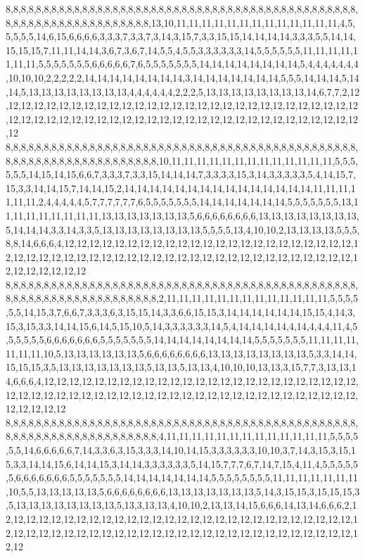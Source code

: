 8,8,8,8,8,8,8,8,8,8,8,8,8,8,8,8,8,8,8,8,8,8,8,8,8,8,8,8,8,8,8,8,8,8,8,8,8,8,8,8,8,8,8,8,8,8,8,8,8,8,8,8,8,8,8,8,8,8,8,8,8,8,8,8,8,13,10,11,11,11,11,11,11,11,11,11,11,11,11,11,4,5,5,5,5,5,14,6,15,6,6,6,6,3,3,3,7,3,3,7,3,14,3,15,7,3,3,15,15,14,14,14,14,3,3,3,5,5,14,14,15,15,15,7,11,11,14,14,3,6,7,3,6,7,14,5,5,4,5,5,3,3,3,3,3,3,14,5,5,5,5,5,5,11,11,11,11,11,11,11,5,5,5,5,5,5,5,6,6,6,6,6,7,6,5,5,5,5,5,5,5,14,14,14,14,14,14,14,14,5,4,4,4,4,4,4,4,10,10,10,2,2,2,2,2,14,14,14,14,14,14,14,14,3,14,14,14,14,14,14,14,5,5,5,14,14,14,5,14,14,5,13,13,13,13,13,13,13,13,4,4,4,4,4,4,2,2,2,5,13,13,13,13,13,13,13,13,14,6,7,7,2,12,12,12,12,12,12,12,12,12,12,12,12,12,12,12,12,12,12,12,12,12,12,12,12,12,12,12,12,12,12,12,12,12,12,12,12,12,12,12,12,12,12,12,12,12,12,12,12,12,12,12,12,12,12,12,12,12,12
8,8,8,8,8,8,8,8,8,8,8,8,8,8,8,8,8,8,8,8,8,8,8,8,8,8,8,8,8,8,8,8,8,8,8,8,8,8,8,8,8,8,8,8,8,8,8,8,8,8,8,8,8,8,8,8,8,8,8,8,8,8,8,8,8,8,10,11,11,11,11,11,11,11,11,11,11,11,11,11,5,5,5,5,5,5,14,15,14,15,6,6,7,3,3,3,7,3,3,15,14,14,14,7,3,3,3,3,15,3,14,3,3,3,3,3,5,4,14,15,7,15,3,3,14,14,15,7,14,14,15,2,14,14,14,14,14,14,14,14,14,14,14,14,14,14,14,11,11,11,11,11,11,2,4,4,4,4,4,5,7,7,7,7,7,7,6,5,5,5,5,5,5,5,14,14,14,14,14,14,14,5,5,5,5,5,5,5,13,11,11,11,11,11,11,11,11,13,13,13,13,13,13,13,5,6,6,6,6,6,6,6,6,13,13,13,13,13,13,13,13,5,14,14,14,3,3,14,3,3,5,13,13,13,13,13,13,13,13,5,5,5,5,13,4,10,10,2,13,13,13,13,5,5,5,8,8,14,6,6,6,4,12,12,12,12,12,12,12,12,12,12,12,12,12,12,12,12,12,12,12,12,12,12,12,12,12,12,12,12,12,12,12,12,12,12,12,12,12,12,12,12,12,12,12,12,12,12,12,12,12,12,12,12,12,12,12,12,12,12
8,8,8,8,8,8,8,8,8,8,8,8,8,8,8,8,8,8,8,8,8,8,8,8,8,8,8,8,8,8,8,8,8,8,8,8,8,8,8,8,8,8,8,8,8,8,8,8,8,8,8,8,8,8,8,8,8,8,8,8,8,8,8,8,8,8,2,11,11,11,11,11,11,11,11,11,11,11,11,11,5,5,5,5,5,5,14,15,3,7,6,6,7,3,3,3,6,3,15,15,14,3,3,6,6,15,15,3,14,14,14,14,14,14,15,15,4,14,3,15,3,15,3,3,14,14,15,6,14,5,15,10,5,14,3,3,3,3,3,3,14,5,4,14,14,14,14,4,14,4,4,4,11,4,5,5,5,5,5,5,6,6,6,6,6,6,6,5,5,5,5,5,5,5,14,14,14,14,14,14,14,14,5,5,5,5,5,5,5,11,11,11,11,11,11,11,10,5,13,13,13,13,13,13,5,6,6,6,6,6,6,6,6,13,13,13,13,13,13,13,13,5,3,3,14,14,15,15,15,3,5,13,13,13,13,13,13,13,5,13,13,5,13,13,4,10,10,10,13,13,3,15,7,7,3,13,13,14,6,6,6,4,12,12,12,12,12,12,12,12,12,12,12,12,12,12,12,12,12,12,12,12,12,12,12,12,12,12,12,12,12,12,12,12,12,12,12,12,12,12,12,12,12,12,12,12,12,12,12,12,12,12,12,12,12,12,12,12,12,12
8,8,8,8,8,8,8,8,8,8,8,8,8,8,8,8,8,8,8,8,8,8,8,8,8,8,8,8,8,8,8,8,8,8,8,8,8,8,8,8,8,8,8,8,8,8,8,8,8,8,8,8,8,8,8,8,8,8,8,8,8,8,8,8,8,8,4,11,11,11,11,11,11,11,11,11,11,11,11,11,5,5,5,5,5,5,14,6,6,6,6,6,7,14,3,3,6,3,15,3,3,3,14,10,14,15,3,3,3,3,3,3,10,10,3,7,14,3,15,3,15,15,3,3,14,14,15,6,14,14,15,3,14,14,3,3,3,3,3,3,5,14,15,7,7,7,6,7,14,7,15,4,11,4,5,5,5,5,5,5,6,6,6,6,6,6,6,5,5,5,5,5,5,5,14,14,14,14,14,14,14,5,5,5,5,5,5,5,5,11,11,11,11,11,11,11,10,5,5,13,13,13,13,13,5,6,6,6,6,6,6,6,6,13,13,13,13,13,13,13,5,14,3,15,15,3,15,15,15,3,5,13,13,13,13,13,13,13,13,5,13,3,13,13,4,10,10,2,13,13,14,15,6,6,6,14,13,14,6,6,6,2,12,12,12,12,12,12,12,12,12,12,12,12,12,12,12,12,12,12,12,12,12,12,12,12,12,12,12,12,12,12,12,12,12,12,12,12,12,12,12,12,12,12,12,12,12,12,12,12,12,12,12,12,12,12,12,12,12,12
